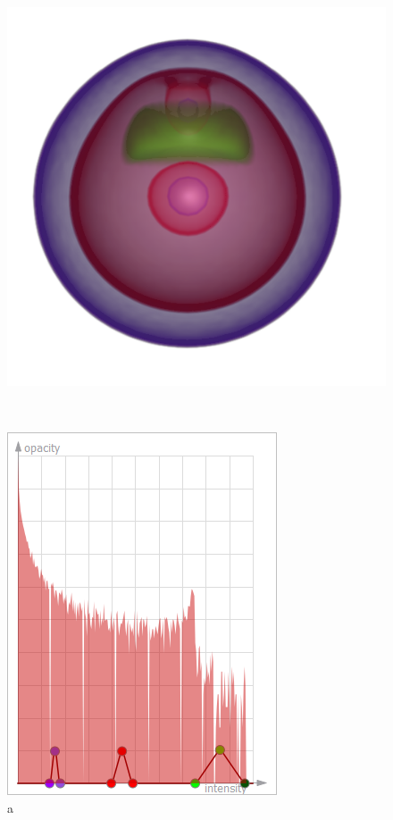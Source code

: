 \begin{figure}
\centering
	\begin{minipage}{.25\textwidth}
	\includegraphics[width=1\linewidth]{images/nucleon_naive}
	\caption{a}	
	\end{minipage}~
	\begin{minipage}{.25\textwidth}
	\includegraphics[width=1\linewidth]{images/tf_nucleon_naive}

\end{minipage}
\end{figure}
